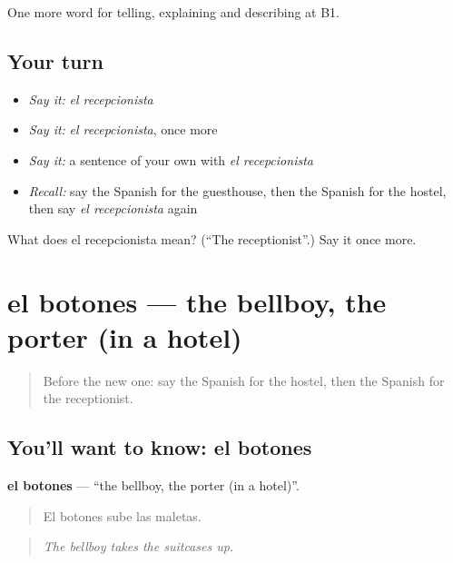 \begin{grammarlens}[title={What you've built}]
One more word for telling, explaining and describing at B1.
\end{grammarlens}

\subsection*{Your turn}
\begin{itemize}
\raggedright
  \item \emph{Say it:} \emph{el recepcionista}
  \item \emph{Say it:} \emph{el recepcionista}, once more
  \item \emph{Say it:} a sentence of your own with \emph{el recepcionista}
  \item \emph{Recall:} say the Spanish for the guesthouse, then the Spanish for the hostel, then say \emph{el recepcionista} again
\end{itemize}

\begin{tcolorbox}[breakable,colback=teal!4,colframe=teal!35!black,title={Before you move on}]
What does el recepcionista mean? (\textquotedblleft{}The receptionist\textquotedblright{}.) Say it once more.
\end{tcolorbox}
\section[el botones]{el botones — the bellboy, the porter (in a hotel)}

\label{lesson:ES-C661-botones}



\begin{quote}
Before the new one: say the Spanish for the hostel, then the Spanish for the receptionist.
\end{quote}

\subsection*{You'll want to know: el botones}
\textbf{el botones} — \textquotedblleft{}the bellboy, the porter (in a hotel)\textquotedblright{}.

\begin{quote}
El botones sube las maletas.
\end{quote}

\begin{quote}
\emph{The bellboy takes the suitcases up.}
\end{quote}

